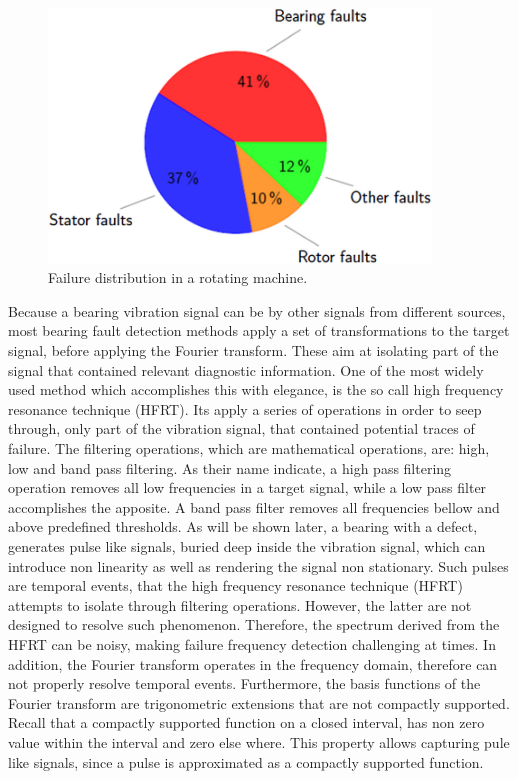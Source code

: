 \documentclass[../Main/thesis.tex]{subfiles}
\begin{document}
\begin{figure}[H] %
   \centering
   \includegraphics[width=4in]{../fig/pie.png} 
   \caption{Failure distribution in a rotating machine. }
   \label{fig:pie}
\end{figure}
\justify
Because a bearing vibration signal can be  by other signals from different sources, most bearing fault detection methods apply a set of transformations to the target signal, before applying the Fourier transform. These  aim at isolating part of the signal that contained relevant diagnostic information. One of the most widely used method which accomplishes this with elegance, is the so call high frequency resonance technique (HFRT). Its apply a series of  operations in order to seep through, only part of the vibration signal, that contained potential traces of failure. The filtering operations, which are mathematical operations, are: high, low and band pass filtering. As their name indicate, a high pass filtering operation removes all low frequencies in a target signal, while a low pass filter accomplishes the apposite.
A band pass filter removes all frequencies bellow and above predefined thresholds. 
\justify
As will be shown later, a bearing with a defect, generates pulse like signals, buried deep inside the vibration signal, which can introduce non linearity as well as rendering the signal non stationary. Such pulses are temporal events, that the high frequency resonance technique (HFRT) attempts to isolate through filtering operations. However, the latter are not designed to resolve such phenomenon. Therefore, the spectrum derived from the HFRT can be noisy, making failure frequency detection challenging at times. In addition, the Fourier transform operates in the frequency domain, therefore can not properly resolve temporal events. Furthermore, the basis functions of the Fourier transform are trigonometric extensions that are not compactly supported. Recall that a compactly supported function on a closed interval, has non zero value within the interval and zero else where. This property allows capturing pule like signals, since a pulse is approximated as a compactly supported function.
\end{document}
